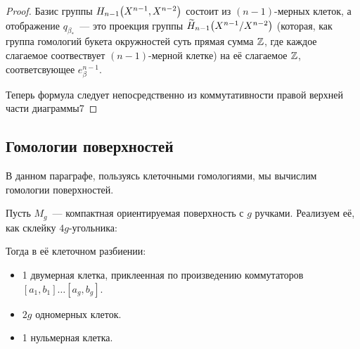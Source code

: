 \begin{proof}
        Базис группы $H_{n - 1}\lr*{X^{n - 1}, X^{n - 2}}$ состоит из $(n - 1)$-мерных клеток, а отображение $q_{\beta_{*}}$~--- это проекция группы
        $\widetilde{H}_{n - 1}\lr*{X^{n - 1}/X^{n - 2}}$ (которая, как группа гомологий букета окружностей суть прямая сумма $\mathbb{Z}$, где каждое слагаемое соотвествует $(n - 1)$-мерной клетке)
        на её слагаемое $\mathbb{Z}$, соответсвующее $e_{\beta}^{n - 1}$.

        Теперь формула следует непосредственно из коммутативности правой верхней части диаграммы7
    \end{proof}


    \subsection{Гомологии поверхностей}

    В данном параграфе, пользуясь клеточными гомологиями, мы вычислим гомологии поверхностей.

    Пусть $M_{g}$~--- компактная ориентируемая поверхность с $g$ ручками. Реализуем её, как склейку $4g$-угольника:
    \begin{center}
    \end{center}

    Тогда в её клеточном разбиении:
    \begin{itemize}
        \item 1 двумерная клетка, приклеенная по произведению коммутаторов $[a_1, b_1] \ldots [a_{g}, b_{g}]$.
        \item $2g$ одномерных клеток.
        \item 1 нульмерная клетка.
    \end{itemize}

